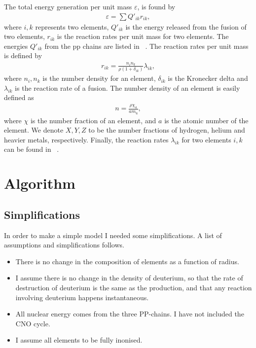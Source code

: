 \documentclass[a4paper, 11pt, english]{article}
\begin{document}
The total energy generation per unit mass $\varepsilon$, is found by
\begin{align}
	\varepsilon = \sum Q'_{ik} r_{ik},
	\label{eq:epsilon}
\end{align}
where $i,k$ represents two elements, $Q'_{ik}$ is the energy released from the fusion of
two elements, $r_{ik}$ is the reaction rates per unit mass for two elements. The energies
$Q'_{ik}$ from the pp chains are listed in ~\cite[p.~39, Table~2.1]{stix}. The reaction
rates per unit mass is defined by
\begin{align}
	r_{ik} = \frac{n_i n_k}{\rho(1 + \delta_{ik})} \lambda_{ik},
	\label{eq:r}
\end{align}
where $n_i,n_k$ is the number density for an element, $\delta_{ik}$ is the Kronecker delta and
$\lambda_{ik}$ is the reaction rate of a fusion. The number density of an element is
easily defined as
\begin{align}
	n = \frac{\rho \chi_a}{am_{\mathrm{u}}},
	\label{eq:n}
\end{align}
where $\chi$ is the number fraction of an element, and $a$ is the atomic number of the
element. We denote $X, Y, Z$ to be the number fractions of hydrogen, helium and heavier
metals, respectively. Finally, the reaction rates $\lambda_{ik}$ for two elements
$i,k$ can be found in ~\cite[p.~46, Table~2.3]{stix}.


\section{Algorithm}
\subsection{Simplifications}

In order to make a simple model I needed some simplifications. A list of
assumptions and simplifications follows.
\begin{itemize}
	\item[\textbullet] There is no change in the composition of elements as a function of
		radius. 
	\item[\textbullet] I assume there is no change in the density of deuterium, so that
		the rate of destruction of deuterium is the same as the production, and that any
		reaction involving deuterium happens instantaneous.
	\item[\textbullet] All nuclear energy comes from the three PP-chains. I have not
		included the CNO cycle.
	\item[\textbullet] I assume all elements to be fully inonised.
\end{itemize}
\end{document}
